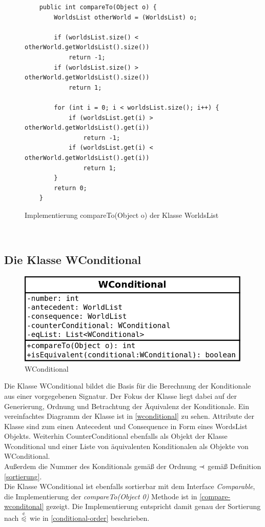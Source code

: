 \documentclass[12pt,a4paper]{article}
\newcommand\dotll{\mathrel{%
    \mathchoice{\QEQQ}{\QEQQ}{\QEQQ}{\QEQQ}%
}}
\def\QEQQ{{%
    \setbox0\hbox{$\leqslant$}%
    \rlap{\hbox to \wd0{\hss \raisebox {1pt}{$\ \cdot$\hss}}}\box0
}}
\newcommand\rdotl{\mathrel{%
    \mathchoice{\RQEQ}{\RQEQ}{\RQEQ}{\RQEQ}%
}}
\def\RQEQ{{%
    \setbox0\hbox{$\prec$}%
    \rlap{\hbox to \wd0{\hss \raisebox {0.01pt}{$\ \cdot$\hss}}}\box0
}}
\begin{document}
\begin{figure}
\begin{lstlisting}
    public int compareTo(Object o) {
        WorldsList otherWorld = (WorldsList) o;

        if (worldsList.size() < otherWorld.getWorldsList().size())
            return -1;
        if (worldsList.size() > otherWorld.getWorldsList().size())
            return 1;

        for (int i = 0; i < worldsList.size(); i++) {
            if (worldsList.get(i) > otherWorld.getWorldsList().get(i))
                return -1;
            if (worldsList.get(i) < otherWorld.getWorldsList().get(i))
                return 1;
        }
        return 0;
    }
\end{lstlisting}
\caption{Implementierung compareTo(Object o) der Klasse WorldsList}
\label{compare-worldslist}
\end{figure} \\
\subsection{Die Klasse WConditional}
\begin{figure}[h]
\includegraphics[width=0.45\linewidth]{bilder/wconditional.png}
\caption{WConditional}
\label{wconditional}
\end{figure}
Die Klasse WConditional bildet die Basis für die Berechnung der Konditionale aus einer vorgegebenen Signatur. Der Fokus der Klasse liegt dabei auf der Generierung, Ordnung und Betrachtung der Äquivalenz der Konditionale. Ein vereinfachtes Diagramm der Klasse ist in \autoref{wconditional} zu sehen. Attribute der Klasse sind zum einen Antecedent und Consequence in Form eines WordsList Objekts. Weiterhin CounterConditional ebenfalls als Objekt der Klasse Wconditional und einer Liste von äquivalenten Konditionalen als Objekte von WConditional.\\
Außerdem die Nummer des Konditionals gemäß der Ordnung $\rdotl$ gemäß Definition \ref{sortierung}. \\
Die Klasse WConditional ist ebenfalls sortierbar mit dem Interface \textit{Comparable}, die Implementierung der \textit{compareTo(Object 0)} Methode ist in \autoref{compare-wconditonal} gezeigt. Die Implementierung entspricht damit genau der Sortierung nach $\overset{\mathrm{c}}{\dotll}$ wie in \autoref{conditional-order} beschrieben.
\end{document}
